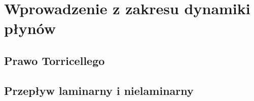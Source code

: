\section{Wprowadzenie z zakresu dynamiki płynów}
\label{sec:plyny}


\subsection{Prawo Torricellego}
\label{sub:plyny-torr}


\subsection{Przepływ laminarny i nielaminarny}
\label{sub:plyny-przeplyw}